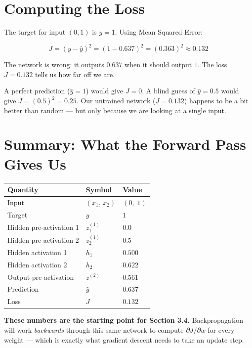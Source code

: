 \documentclass[12pt, a4paper]{article}
\newif\ifstudentmode
\newcommand{\sol}[2][6cm]{%
  \ifstudentmode
    \underline{\hspace{#1}}%
  \else
    {#2}%
  \fi
}
\theoremstyle{definition}
\newcommand{\yhat}{\hat{y}}
\begin{document}
\section{Computing the Loss}

The target for input $(0,1)$ is $y = 1$.
Using Mean Squared Error:

\[
  J = (y - \yhat)^2 = (1 - 0.637)^2 = (0.363)^2 \approx \sol[3cm]{0.132}
\]

The network is wrong: it outputs $0.637$ when it should output $1$.
The loss $J = 0.132$ tells us how far off we are.

\begin{notebox}
A perfect prediction ($\yhat = 1$) would give $J = 0$.
A blind guess of $\yhat = 0.5$ would give $J = (0.5)^2 = 0.25$.
Our untrained network ($J = 0.132$) happens to be a bit better than random
--- but only because we are looking at a single input.
\end{notebox}

\section{Summary: What the Forward Pass Gives Us}

\begin{center}
\renewcommand{\arraystretch}{1.4}
\begin{tabular}{lll}
\toprule
Quantity & Symbol & Value \\
\midrule
Input & $(x_1,\, x_2)$ & $(0,\; 1)$ \\
Target & $y$ & $1$ \\
\midrule
Hidden pre-activation 1 & $z^{(1)}_1$ & $0.0$ \\
Hidden pre-activation 2 & $z^{(1)}_2$ & $0.5$ \\
Hidden activation 1     & $h_1$        & $0.500$ \\
Hidden activation 2     & $h_2$        & $0.622$ \\
\midrule
Output pre-activation   & $z^{(2)}$    & $0.561$ \\
Prediction              & $\yhat$      & $0.637$ \\
\midrule
Loss                    & $J$          & $0.132$ \\
\bottomrule
\end{tabular}
\end{center}

\vspace{0.5em}

\begin{notebox}
\textbf{These numbers are the starting point for Section 3.4.}
Backpropagation will work \emph{backwards} through this same network to
compute $\partial J / \partial w$ for every weight --- which is exactly what
gradient descent needs to take an update step.
\end{notebox}
\end{document}
